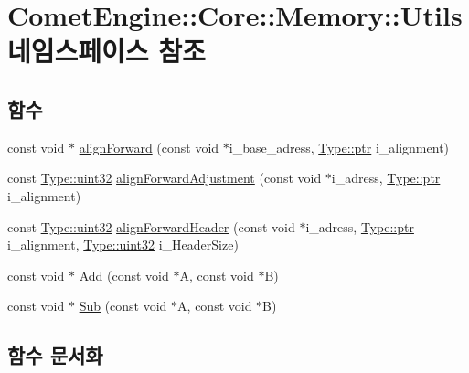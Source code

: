 \hypertarget{namespace_comet_engine_1_1_core_1_1_memory_1_1_utils}{}\section{Comet\+Engine\+:\+:Core\+:\+:Memory\+:\+:Utils 네임스페이스 참조}
\label{namespace_comet_engine_1_1_core_1_1_memory_1_1_utils}
\subsection*{함수}
\begin{DoxyCompactItemize}
\item 
const void $\ast$ \hyperlink{namespace_comet_engine_1_1_core_1_1_memory_1_1_utils_a893da9f083981a41e4ada733c3d0661f}{align\+Forward} (const void $\ast$i\+\_\+base\+\_\+adress, \hyperlink{namespace_comet_engine_1_1_type_aeb22ad46de677e9a50679dfebeb0e6f0}{Type\+::ptr} i\+\_\+alignment)
\item 
const \hyperlink{namespace_comet_engine_1_1_type_ada4c95a4173a4bb540c8a7f80f3665d2}{Type\+::uint32} \hyperlink{namespace_comet_engine_1_1_core_1_1_memory_1_1_utils_aa5a0140d498d631a747be87791063f2d}{align\+Forward\+Adjustment} (const void $\ast$i\+\_\+adress, \hyperlink{namespace_comet_engine_1_1_type_aeb22ad46de677e9a50679dfebeb0e6f0}{Type\+::ptr} i\+\_\+alignment)
\item 
const \hyperlink{namespace_comet_engine_1_1_type_ada4c95a4173a4bb540c8a7f80f3665d2}{Type\+::uint32} \hyperlink{namespace_comet_engine_1_1_core_1_1_memory_1_1_utils_a57bbceefc56fa0e2ec1e472d85ce5e19}{align\+Forward\+Header} (const void $\ast$i\+\_\+adress, \hyperlink{namespace_comet_engine_1_1_type_aeb22ad46de677e9a50679dfebeb0e6f0}{Type\+::ptr} i\+\_\+alignment, \hyperlink{namespace_comet_engine_1_1_type_ada4c95a4173a4bb540c8a7f80f3665d2}{Type\+::uint32} i\+\_\+\+Header\+Size)
\item 
const void $\ast$ \hyperlink{namespace_comet_engine_1_1_core_1_1_memory_1_1_utils_a93ae170a43dac9da0116187242b35a6f}{Add} (const void $\ast$A, const void $\ast$B)
\item 
const void $\ast$ \hyperlink{namespace_comet_engine_1_1_core_1_1_memory_1_1_utils_a4e360b8988f0de099daa987e3b5f09ed}{Sub} (const void $\ast$A, const void $\ast$B)
\end{DoxyCompactItemize}


\subsection{함수 문서화}
\mbox{\label{namespace_comet_engine_1_1_core_1_1_memory_1_1_utils_a93ae170a43dac9da0116187242b35a6f}} 
